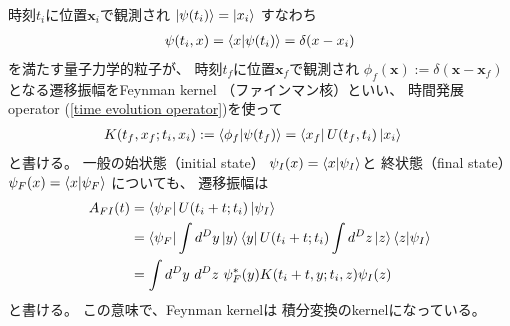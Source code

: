 時刻$t_i$に位置$\bm{x}_i$で観測され
$ \ket{ \psi(t_i) } = \ket{ x_i }$
すなわち
\begin{align}
    \psi(t_i, x)
    =
    \braket{ x | \psi(t_i) }
    =
    \delta( x - x_i )
\end{align}
を満たす量子力学的粒子が、
時刻$t_f$に位置$\bm{x}_f$で観測され
$\phi_f(\bm{x}) := \delta(\bm{x} - \bm{x}_f)$
となる遷移振幅をFeynman kernel
（ファインマン核）といい、
時間発展operator
(\ref{time evolution operator})を使って
\begin{align}
    K( t_f, x_f ; t_i, x_i )
&:=
    \braket{ \phi_f | \psi(t_f) }
=
    \bra{ x_f }
    U(t_f, t_i)
    \ket{ x_i }
\end{align}
と書ける。
一般の始状態（initial state）
$\psi_I( x ) = \braket{ x | \psi_I }$と
終状態（final state）
$\psi_F( x ) = \braket{ x | \psi_F }$
についても、
遷移振幅は
\begin{align}
    A_{FI}(t)
    &=
    \bra{\psi_F}
        \hat{U} ( t_i + t ; t_i )
    \ket{\psi_I}
\notag\\&=
    \bra{\psi_F}
        \int d^D y
        \ket{ \bm{y} }
        \bra{ \bm{y} }
    \hat{U} ( t_i + t ; t_i )
        \int d^D z
        \ket{ \bm{z} }
    \braket{ \bm{z} | \psi_I}
\notag\\&=
    \int d^D y\ 
        d^D z\ 
    \psi_F^*( \bm{y} )
        K( t_i + t, \bm{y} ; t_i, \bm{z} )
    \psi_I  ( \bm{z} )
\label{transition amplitude with feynman kernel}
\end{align}
と書ける。
この意味で、Feynman kernelは
積分変換のkernelになっている。


